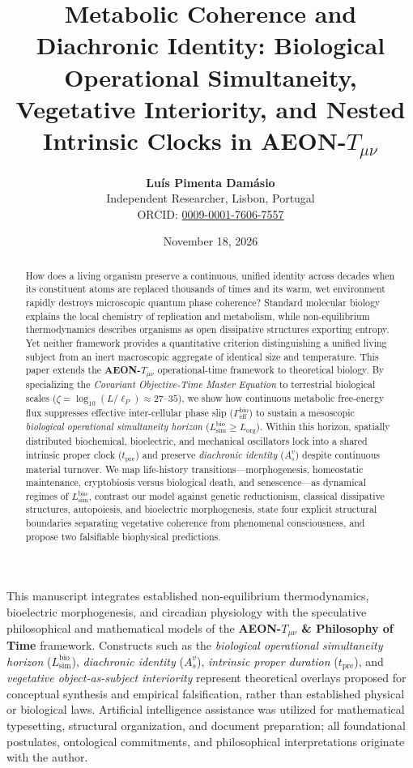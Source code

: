 \documentclass[11pt,a4paper]{article}
\title{\textbf{\Large Metabolic Coherence and Diachronic Identity: Biological Operational Simultaneity, Vegetative Interiority, and Nested Intrinsic Clocks in AEON-$T_{\mu\nu}$}}
\author{\textbf{Luís Pimenta Damásio}\\
\small Independent Researcher, Lisbon, Portugal\\
\small ORCID: \href{https://orcid.org/0009-0001-7606-7557}{0009-0001-7606-7557}}
\date{November 18, 2026}
\begin{document}
\maketitle

\begin{disclosurebox}
\small
This manuscript integrates established non-equilibrium thermodynamics, bioelectric morphogenesis, and circadian physiology with the speculative philosophical and mathematical models of the \textbf{AEON-$T_{\mu\nu}$ \& Philosophy of Time} framework. Constructs such as the \emph{biological operational simultaneity horizon} ($L_{\mathrm{sim}}^{\mathrm{bio}}$), \emph{diachronic identity} ($A_s^v$), \emph{intrinsic proper duration} ($t_{\mathrm{pre}}$), and \emph{vegetative object-as-subject interiority} represent theoretical overlays proposed for conceptual synthesis and empirical falsification, rather than established physical or biological laws. Artificial intelligence assistance was utilized for mathematical typesetting, structural organization, and document preparation; all foundational postulates, ontological commitments, and philosophical interpretations originate with the author.
\end{disclosurebox}

\begin{abstract}
\noindent How does a living organism preserve a continuous, unified identity across decades when its constituent atoms are replaced thousands of times and its warm, wet environment rapidly destroys microscopic quantum phase coherence? Standard molecular biology explains the local chemistry of replication and metabolism, while non-equilibrium thermodynamics describes organisms as open dissipative structures exporting entropy. Yet neither framework provides a quantitative criterion distinguishing a unified living subject from an inert macroscopic aggregate of identical size and temperature. This paper extends the \textbf{AEON-$T_{\mu\nu}$} operational-time framework to theoretical biology. By specializing the \emph{Covariant Objective-Time Master Equation} to terrestrial biological scales ($\zeta = \log_{10}(L/\ell_P) \approx 27\text{--}35$), we show how continuous metabolic free-energy flux suppresses effective inter-cellular phase slip ($\Gamma_{\mathrm{eff}}^{\mathrm{bio}}$) to sustain a mesoscopic \emph{biological operational simultaneity horizon} ($L_{\mathrm{sim}}^{\mathrm{bio}} \ge L_{\mathrm{org}}$). Within this horizon, spatially distributed biochemical, bioelectric, and mechanical oscillators lock into a shared intrinsic proper clock ($t_{\mathrm{pre}}$) and preserve \emph{diachronic identity} ($A_s^v$) despite continuous material turnover. We map life-history transitions---morphogenesis, homeostatic maintenance, cryptobiosis versus biological death, and senescence---as dynamical regimes of $L_{\mathrm{sim}}^{\mathrm{bio}}$, contrast our model against genetic reductionism, classical dissipative structures, autopoiesis, and bioelectric morphogenesis, state four explicit structural boundaries separating vegetative coherence from phenomenal consciousness, and propose two falsifiable biophysical predictions.
\end{abstract}
\end{document}
